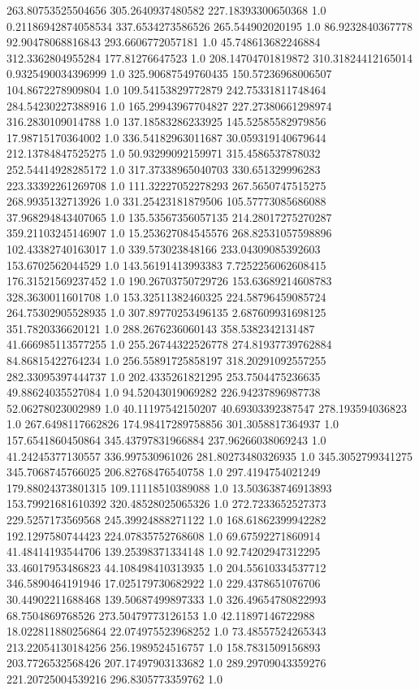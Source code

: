 263.80753525504656	305.2640937480582	227.18393300650368	1.0
0.21186942874058534	337.6534273586526	265.544902020195	1.0
86.9232840367778	92.90478068816843	293.6606772057181	1.0
45.748613682246884	312.3362804955284	177.81276647523	1.0
208.14704701819872	310.31824412165014	0.9325490034396999	1.0
325.90687549760435	150.57236968006507	104.8672278909804	1.0
109.54153829772879	242.75331811748464	284.54230227388916	1.0
165.29943967704827	227.27380661298974	316.2830109014788	1.0
137.18583286233925	145.52585582979856	17.98715170364002	1.0
336.54182963011687	30.059319140679644	212.13784847525275	1.0
50.93299092159971	315.4586537878032	252.54414928285172	1.0
317.37338965040703	330.651329996283	223.33392261269708	1.0
111.32227052278293	267.5650747515275	268.9935132713926	1.0
331.25423181879506	105.57773085686088	37.968294843407065	1.0
135.53567356057135	214.28017275270287	359.21103245146907	1.0
15.253627084545576	268.82531057598896	102.43382740163017	1.0
339.573023848166	233.04309085392603	153.6702562044529	1.0
143.56191413993383	7.7252256062608415	176.31521569237452	1.0
190.26703750729726	153.63689214608783	328.3630011601708	1.0
153.32511382460325	224.58796459085724	264.75302905528935	1.0
307.89770253496135	2.687609931698125	351.7820336620121	1.0
288.2676236060143	358.5382342131487	41.666985113577255	1.0
255.26744322526778	274.81937739762884	84.86815422764234	1.0
256.55891725858197	318.20291092557255	282.33095397444737	1.0
202.4335261821295	253.7504475236635	49.88624035527084	1.0
94.52043019069282	226.94237896987738	52.06278023002989	1.0
40.11197542150207	40.69303392387547	278.193594036823	1.0
267.6498117662826	174.98417289758856	301.3058817364937	1.0
157.6541860450864	345.43797831966884	237.96266038069243	1.0
41.24245377130557	336.997530961026	281.80273480326935	1.0
345.3052799341275	345.7068745766025	206.82768476540758	1.0
297.4194754021249	179.88024373801315	109.11118510389088	1.0
13.503638746913893	153.79921681610392	320.48528025065326	1.0
272.7233652527373	229.5257173569568	245.39924888271122	1.0
168.61862399942282	192.1297580744423	224.07835752768608	1.0
69.67592271860914	41.48414193544706	139.25398371334148	1.0
92.74202947312295	33.46017953486823	44.108498410313935	1.0
204.55610334537712	346.5890464191946	17.025179730682922	1.0
229.4378651076706	30.44902211688468	139.50687499897333	1.0
326.49654780822993	68.7504869768526	273.50479773126153	1.0
42.11897146722988	18.022811880256864	22.074975523968252	1.0
73.48557524265343	213.22054130184256	256.1989524516757	1.0
158.7831509156893	203.7726532568426	207.17497903133682	1.0
289.29709043359276	221.20725004539216	296.8305773359762	1.0
